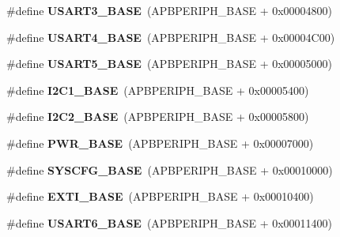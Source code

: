 \begin{DoxyCompactItemize}
\#define {\bfseries U\+S\+A\+R\+T3\+\_\+\+B\+A\+SE}~(A\+P\+B\+P\+E\+R\+I\+P\+H\+\_\+\+B\+A\+SE + 0x00004800)
\item 
\mbox{\label{group___peripheral__memory__map_gafa384bb1e7d610a806f7c1f1dbc72ac5}} 
\#define {\bfseries U\+S\+A\+R\+T4\+\_\+\+B\+A\+SE}~(A\+P\+B\+P\+E\+R\+I\+P\+H\+\_\+\+B\+A\+SE + 0x00004\+C00)
\item 
\mbox{\label{group___peripheral__memory__map_gab34de0b56d40b6895b53bb60ced2574f}} 
\#define {\bfseries U\+S\+A\+R\+T5\+\_\+\+B\+A\+SE}~(A\+P\+B\+P\+E\+R\+I\+P\+H\+\_\+\+B\+A\+SE + 0x00005000)
\item 
\mbox{\label{group___peripheral__memory__map_gacd72dbffb1738ca87c838545c4eb85a3}} 
\#define {\bfseries I2\+C1\+\_\+\+B\+A\+SE}~(A\+P\+B\+P\+E\+R\+I\+P\+H\+\_\+\+B\+A\+SE + 0x00005400)
\item 
\mbox{\label{group___peripheral__memory__map_ga04bda70f25c795fb79f163b633ad4a5d}} 
\#define {\bfseries I2\+C2\+\_\+\+B\+A\+SE}~(A\+P\+B\+P\+E\+R\+I\+P\+H\+\_\+\+B\+A\+SE + 0x00005800)
\item 
\mbox{\label{group___peripheral__memory__map_gac691ec23dace8b7a649a25acb110217a}} 
\#define {\bfseries P\+W\+R\+\_\+\+B\+A\+SE}~(A\+P\+B\+P\+E\+R\+I\+P\+H\+\_\+\+B\+A\+SE + 0x00007000)
\item 
\mbox{\label{group___peripheral__memory__map_ga62246020bf3b34b6a4d8d0e84ec79d3d}} 
\#define {\bfseries S\+Y\+S\+C\+F\+G\+\_\+\+B\+A\+SE}~(A\+P\+B\+P\+E\+R\+I\+P\+H\+\_\+\+B\+A\+SE + 0x00010000)
\item 
\mbox{\label{group___peripheral__memory__map_ga87371508b3bcdcd98cd1ec629be29061}} 
\#define {\bfseries E\+X\+T\+I\+\_\+\+B\+A\+SE}~(A\+P\+B\+P\+E\+R\+I\+P\+H\+\_\+\+B\+A\+SE + 0x00010400)
\item 
\mbox{\label{group___peripheral__memory__map_gade4d3907fd0387ee832f426f52d568bb}} 
\#define {\bfseries U\+S\+A\+R\+T6\+\_\+\+B\+A\+SE}~(A\+P\+B\+P\+E\+R\+I\+P\+H\+\_\+\+B\+A\+SE + 0x00011400)

\end{DoxyCompactItemize}
